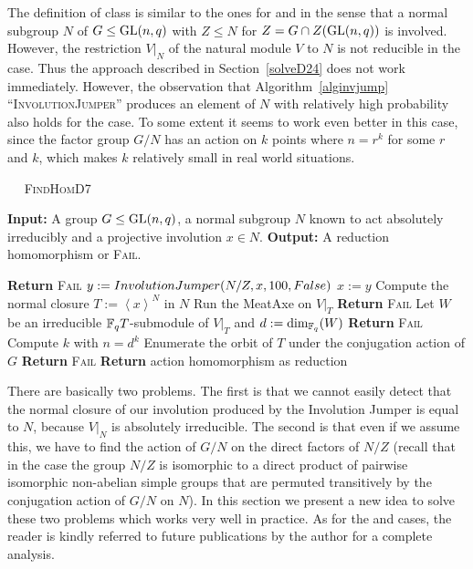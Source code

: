 The definition of class  is similar to the ones for  and  in
the sense that a normal subgroup $N$ of $G \le \GL(n,q)$ with $Z \le N$
for $Z = G \cap Z(\GL(n,q))$ is involved.
However, the restriction $V|_N$ of the natural module $V$ to $N$ is not
reducible in the  case. Thus the approach described in
Section~\ref{solveD24} does not work immediately. However, the observation
that Algorithm~\ref{alginvjump} ``\textsc{InvolutionJumper}'' produces an
element of $N$ with relatively high probability also holds for the 
case. To some extent it seems to work even better in this case, since the 
factor group $G/N$ has an action on $k$ points where $n=r^k$ for some $r$
and $k$, which makes $k$ relatively small in real world situations.

\begin{algorithm}
\caption{$\quad$ \textsc{FindHomD7}}
%
\label{algreductionD7}
\begin{algorithmic}
\STATE \textbf{Input:} A group $G \le \GL(n,q)$, a normal subgroup $N$ known 
to act absolutely irreducibly 
\STATE \mbox{} and a projective involution $x \in N$.
\STATE \textbf{Output:} A reduction homomorphism or \textsc{Fail}.

\smallskip
{}
    \STATE \textbf{Return} \textsc{Fail}
\ENDIF
{}
    \STATE $y := \textsc{InvolutionJumper}(N/Z,x,100,\textsc{False})$
        \STATE $x := y$
    \ENDIF
\ENDFOR
\STATE Compute the normal closure $T := \left< x \right>^N$ in $N$
\STATE Run the MeatAxe on $V|_T$
    \STATE \textbf{Return} \textsc{Fail}
\ENDIF
\STATE Let $W$ be an irreducible $\mathbb{F}_q T$-submodule of $V|_T$ and $d :=
\dim_{\mathbb{F}_q}(W)$
    \STATE \textbf{Return} \textsc{Fail}
\ENDIF
\STATE Compute $k$ with $n=d^k$
\STATE Enumerate the orbit of $T$ under the conjugation action of $G$
    \STATE \textbf{Return} \textsc{Fail}
\ENDIF
\STATE \textbf{Return} action homomorphism as reduction
\end{algorithmic}
\end{algorithm}

There are basically two problems. The first is that we cannot easily detect 
that the normal closure of our involution produced by the Involution
Jumper is equal to $N$, because $V|_N$ is absolutely irreducible. The
second is that even if we assume this, we have to find the action of $G/N$ on
the direct factors of $N/Z$ (recall that in the  case the group $N/Z$
is isomorphic to a direct product of pairwise isomorphic non-abelian simple
groups that are permuted transitively by the conjugation action of $G/N$ on
$N$). In this section we present a new idea to solve these two problems
which works very well in practice. As for the  and  cases, the reader is
kindly referred to future publications by the author for a complete analysis.

